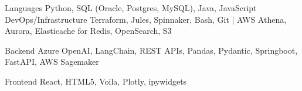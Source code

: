 

\begin{cvskills}
  \cvskill
    {Languages} %
    {Python, SQL (Oracle, Postgres, MySQL), Java, JavaScript} %
  \cvskill
    {DevOps/Infrastructure} %
    {Terraform, Jules, Spinnaker, Bash, Git | AWS Athena, Aurora, Elasticache for Redis, OpenSearch, S3} %

  \cvskill
    {Backend} %
    {Azure OpenAI, LangChain, REST APIs, Pandas, Pydantic, Springboot, FastAPI, AWS Sagemaker} %

  \cvskill
    {Frontend} %
    {React, HTML5, Voila, Plotly, ipywidgets} %


\end{cvskills}